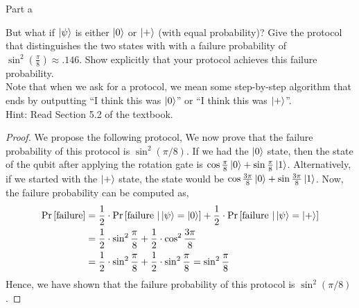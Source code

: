 \begin{solution}{Part a}\label{ques:4a}
  \begin{question}
    But what if $\ket{\psi}$ is either $\ket{0}$ or $\ket{+}$ (with equal probability)? Give the protocol that distinguishes the two states with with a failure probability of $\sin^2(\frac{\pi}{8})\approx .146$. Show explicitly that your protocol achieves this failure probability.
\\ Note that when we ask for a protocol, we mean some step-by-step algorithm that ends by outputting ``I think this was $\ket{0}$'' or ``I think this was $\ket{+}$''.
\\ Hint: Read Section 5.2 of the textbook.
  \end{question}
  \tcblower{}
  \begin{proof}
    We propose the following protocol,
    We now prove that the failure probability of this protocol is $\sin^2(\pi/8)$. If we had the $\ket{0}$ state, then the state of the qubit after applying the rotation gate is $\cos\frac{\pi}{8}\ket{0} + \sin\frac{\pi}{8}\ket{1}$. Alternatively, if we started with the $\ket{+}$ state, the state would be $\cos\frac{3\pi}{8}\ket{0} + \sin\frac{3\pi}{8}\ket{1}$. Now, the failure probability can be computed as,
    \begin{equation}
      \begin{split}
        \Pr\left[ \text{failure} \right] &= \frac{1}{2}\cdot\Pr\left[ \text{failure }| \ket{\psi} = \ket{0} \right] + \frac{1}{2}\cdot\Pr\left[ \text{failure }| \ket{\psi} = \ket{+} \right]\\
        &= \frac{1}{2}\cdot\sin^2\frac{\pi}{8} + \frac{1}{2}\cdot\cos^2\frac{3\pi}{8}\\
        &= \frac{1}{2}\cdot\sin^2\frac{\pi}{8} + \frac{1}{2}\cdot\sin^2\frac{\pi}{8} = \sin^2\frac{\pi}{8}
      \end{split}
    \end{equation}
    Hence, we have shown that the failure probability of this protocol is $\sin^2(\pi/8)$.
  \end{proof}
\end{solution}

